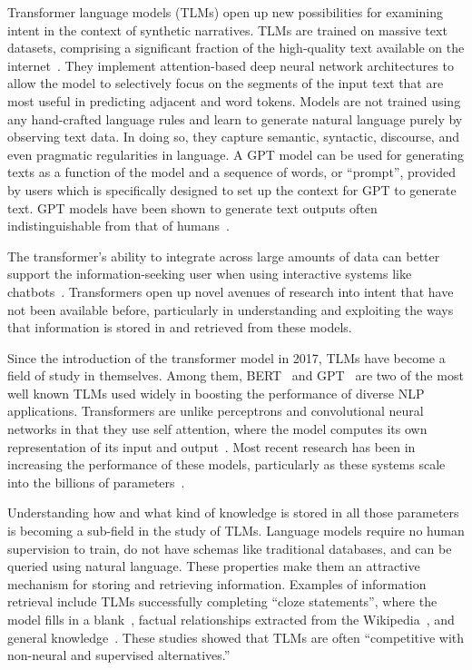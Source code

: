 \documentclass[11pt,dvipdfm]{article}
\begin{document}
Transformer language models (TLMs) open up new possibilities for examining intent in the context of synthetic narratives.  TLMs are trained on massive text datasets, comprising a significant fraction of the high-quality text available on the internet~\cite{brown2020language}. They implement attention-based deep neural network architectures to allow the model to selectively focus on the segments of the input text that are most useful in predicting adjacent and word tokens. Models are not trained using any hand-crafted language rules and learn to generate natural language purely by observing text data. In doing so, they capture semantic, syntactic, discourse, and even pragmatic regularities in language. A GPT model can be used for generating texts as a function of the model and a sequence of words, or \enquote{prompt}, provided by users which is specifically designed to set up the context for GPT to generate text. GPT models have been shown to generate text outputs often indistinguishable from that of humans~\cite{floridi2020gpt}. 

The transformer's ability to integrate across large amounts of data can better support the information-seeking user when using interactive systems like chatbots~\cite{yang2020iart}. Transformers open up novel avenues of research into intent that have not been available before, particularly in understanding and exploiting the ways that information is stored in and retrieved from these models.

Since the introduction of the transformer model in 2017, TLMs have become a field of study in themselves. Among them, BERT~\cite{devlin2018bert} and GPT~\cite{radford2018improving} are two of the most well known TLMs used widely in boosting the performance of diverse NLP applications. Transformers are unlike perceptrons and convolutional neural networks in that they use self attention, where the model computes its own representation of its input and output~\cite{vaswani2017attention}. Most recent research has been in increasing the performance of these models, particularly as these systems scale into the billions of parameters~\cite{radford2019language}. 

Understanding how and what kind of knowledge is stored in all those parameters is becoming a sub-field in the study of TLMs. Language models require no human supervision to train, do not have schemas like traditional databases, and can be queried using natural language. These properties make them an attractive mechanism for storing and retrieving information. Examples of information retrieval include TLMs successfully completing \enquote{cloze statements}, where the model fills in a blank~\cite{petroni2019language}, factual relationships extracted from the Wikipedia~\cite{elsahar2018t}, and general knowledge~\cite{speer2018conceptnet}. These studies showed that TLMs are often \enquote{competitive with non-neural and supervised alternatives.}~\cite{petroni2019language}
\end{document}
